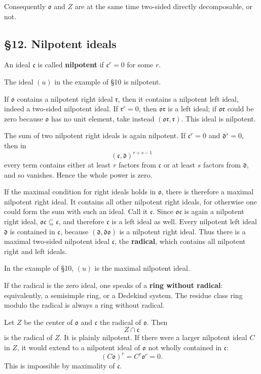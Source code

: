 \documentclass[11pt]{article}
\begin{document}
Consequently \(\mathfrak{o}\) and \(Z\) are at the same time two-sided
directly decomposable, or not.

\subsection{§12. Nilpotent ideals}\label{nilpotent-ideals}

An ideal \(\mathfrak c\) is called \textbf{nilpotent} if
\(\mathfrak c^r=0\) for some \(r\).

The ideal \((u)\) in the example of §10 is nilpotent.

If \(\mathfrak{o}\) contains a nilpotent right ideal \(\mathfrak r\),
then it contains a nilpotent left ideal, indeed a two-sided nilpotent
ideal. If \(\mathfrak r^r=0\), then \(\mathfrak{o}\mathfrak r\) is a
left ideal; if \(\mathfrak{o}\mathfrak r\) could be zero because
\(\mathfrak{o}\) has no unit element, take instead
\((\mathfrak{o}\mathfrak r,\mathfrak r)\). This ideal is nilpotent.

The sum of two nilpotent right ideals is again nilpotent. If
\(\mathfrak c^r=0\) and \(\mathfrak d^s=0\), then in \[
  (\mathfrak c,\mathfrak d)^{r+s-1}
\] every term contains either at least \(r\) factors from
\(\mathfrak c\) or at least \(s\) factors from \(\mathfrak d\), and so
vanishes. Hence the whole power is zero.

If the maximal condition for right ideals holds in \(\mathfrak{o}\),
there is therefore a maximal nilpotent right ideal. It contains all
other nilpotent right ideals, for otherwise one could form the sum with
such an ideal. Call it \(\mathfrak c\). Since
\(\mathfrak{o}\mathfrak c\) is again a nilpotent right ideal,
\(\mathfrak{o}\mathfrak c\subseteq\mathfrak c\), and therefore
\(\mathfrak c\) is a left ideal as well. Every nilpotent left ideal
\(\mathfrak d\) is contained in \(\mathfrak c\), because
\((\mathfrak d,\mathfrak d\mathfrak{o})\) is a nilpotent right ideal.
Thus there is a maximal two-sided nilpotent ideal \(\mathfrak c\), the
\textbf{radical}, which contains all nilpotent right and left ideals.

In the example of §10, \((u)\) is the maximal nilpotent ideal.

If the radical is the zero ideal, one speaks of a \textbf{ring without
radical}: equivalently, a semisimple ring, or a Dedekind system. The
residue class ring modulo the radical is always a ring without radical.

Let \(Z\) be the center of \(\mathfrak{o}\) and \(\mathfrak c\) the
radical of \(\mathfrak{o}\). Then \[
  Z\cap\mathfrak c
\] is the radical of \(Z\). It is plainly nilpotent. If there were a
larger nilpotent ideal \(C\) in \(Z\), it would extend to a nilpotent
ideal of \(\mathfrak{o}\) not wholly contained in \(\mathfrak c\): \[
  (C\mathfrak{o})^r=C^r\mathfrak{o}^r=0.
\] This is impossible by maximality of \(\mathfrak c\).
\end{document}
